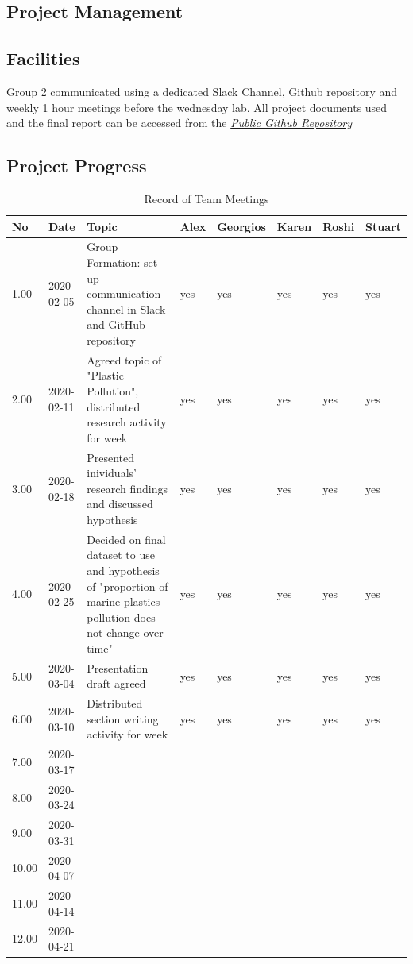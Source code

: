 \documentclass[10pt]{article}\usepackage[]{graphicx}\usepackage[]{color}
\begin{document}
\begin{itemize}





\section{Project Management}\label{mgt}
\subsection{Facilities}
Group 2 communicated using a dedicated Slack Channel, Github repository and weekly 1 hour meetings before the wednesday lab.
All project documents used and the final report can be accessed from the \textit{\href{https://github.com/KarenJewell/CMM507Group2}{Public Github Repository}}

\subsection{Project Progress}
\begin{table}[ht]
\centering
\caption{Record of Team Meetings} 
\label{tab:one}
\begin{tabular}{llp{8cm}lllll}
  \hline
No & Date & Topic & Alex & Georgios & Karen & Roshi & Stuart \\ 
  \hline
1.00 & 2020-02-05 & Group Formation: set up communication channel in Slack and GitHub repository & yes & yes & yes & yes & yes \\ 
  2.00 & 2020-02-11 & Agreed topic of "Plastic Pollution", distributed research activity for week & yes & yes & yes & yes & yes \\ 
  3.00 & 2020-02-18 & Presented inividuals' research findings and discussed hypothesis & yes & yes & yes & yes & yes \\ 
  4.00 & 2020-02-25 & Decided on final dataset to use and hypothesis of "proportion of marine plastics pollution does not change over time" & yes & yes & yes & yes & yes \\ 
  5.00 & 2020-03-04 & Presentation draft agreed & yes & yes & yes & yes & yes \\ 
  6.00 & 2020-03-10 & Distributed section writing activity for week & yes & yes & yes & yes & yes \\ 
  7.00 & 2020-03-17 &  &  &  &  &  &  \\ 
  8.00 & 2020-03-24 &  &  &  &  &  &  \\ 
  9.00 & 2020-03-31 &  &  &  &  &  &  \\ 
  10.00 & 2020-04-07 &  &  &  &  &  &  \\ 
  11.00 & 2020-04-14 &  &  &  &  &  &  \\ 
  12.00 & 2020-04-21 &  &  &  &  &  &  \\ 
   \hline
\end{tabular}
\end{table}






\end{itemize}
\end{document}

